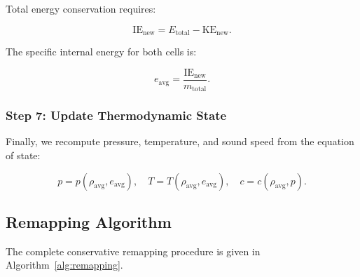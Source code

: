 \documentclass[12pt,a4paper]{article}
\begin{document}
Total energy conservation requires:

\begin{equation}
    \text{IE}_{\text{new}} = E_{\text{total}} - \text{KE}_{\text{new}}.
\end{equation}

The specific internal energy for both cells is:

\begin{equation}
    e_{\text{avg}} = \frac{\text{IE}_{\text{new}}}{m_{\text{total}}}.
\end{equation}

\subsubsection{Step 7: Update Thermodynamic State}

Finally, we recompute pressure, temperature, and sound speed from the equation of state:

\begin{equation}
    p = p(\rho_{\text{avg}}, e_{\text{avg}}), \quad T = T(\rho_{\text{avg}}, e_{\text{avg}}), \quad c = c(\rho_{\text{avg}}, p).
\end{equation}

\subsection{Remapping Algorithm}

The complete conservative remapping procedure is given in Algorithm~\ref{alg:remapping}.
\end{document}
